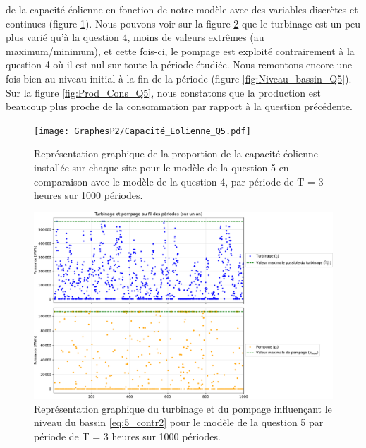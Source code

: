 \documentclass{article}
\begin{document}
de la capacité éolienne en fonction de notre modèle avec des variables discrètes et continues (figure \ref{fig:Capacité_Eolienne_Q5}). Nous pouvons voir sur la figure \ref{fig:Turbinage_pompage_Q5} que le turbinage est un peu plus varié qu'à la question 4, moins de valeurs extrêmes (au maximum/minimum), et cette fois-ci,
le pompage est exploité contrairement à la question 4 où il est nul sur toute la période étudiée. 
Nous remontons encore une fois bien au niveau initial à la fin de la période (figure \ref{fig:Niveau_bassin_Q5}).  
Sur la figure \ref{fig:Prod_Cons_Q5}, nous constatons que la production est beaucoup plus proche de la consommation par rapport à la question précédente.
\begin{figure}[h!]
    \centering
    \texttt{[image: GraphesP2/Capacité\_Eolienne\_Q5.pdf]}
    \caption{Représentation graphique de la proportion de la capacité éolienne installée sur chaque site pour le modèle de la question 5 en comparaison
    avec le modèle de la question 4, par période
    de T = 3 heures sur 1000 périodes.}
    \label{fig:Capacité_Eolienne_Q5}
\end{figure}

\begin{figure}[H]
    \centering
    \includegraphics[scale=0.5]{GraphesP2/Turbinage_pompage_Q5.pdf}
    \caption{Représentation graphique du turbinage et du pompage
    influençant le niveau du bassin \eqref{eq:5_contr2} pour le modèle de la question 5 par période de T = 3 heures sur 1000 périodes.}
    \label{fig:Turbinage_pompage_Q5}
\end{figure}
\end{document}
